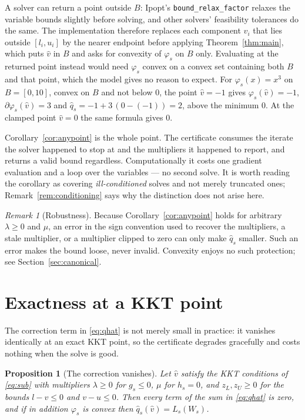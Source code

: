 \documentclass[11pt]{article}
\theoremstyle{plain}
\newtheorem{proposition}[lemma]{Proposition}
\theoremstyle{remark}
\newtheorem{remark}[lemma]{Remark}
\newcommand{\W}{W}
\newcommand{\vhat}{\hat{v}}
\newcommand{\qhat}{\hat{q}}
\begin{document}
A solver can return a point outside $B$: Ipopt's \texttt{bound\_relax\_factor}
relaxes the variable bounds slightly before solving, and other solvers' feasibility
tolerances do the same.  The implementation therefore replaces each component
$\vhat_i$ that lies outside $[l_i, u_i]$ by the nearer endpoint before applying
Theorem~\ref{thm:main}, which puts $\vhat$ in $B$ and asks for convexity of
$\varphi_s$ on $B$ only.  Evaluating at the returned point instead would need
$\varphi_s$ convex on a convex set containing both $B$ and that point, which the
model gives no reason to expect.  For $\varphi_s(x) = x^3$ on $B = [0, 10]$,
convex on $B$ and not below $0$, the point $\vhat = -1$ gives
$\varphi_s(\vhat) = -1$, $\partial \varphi_s(\vhat) = 3$ and
$\qhat_s = -1 + 3\,(0 - (-1)) = 2$, above the minimum $0$.  At the clamped point
$\vhat = 0$ the same formula gives $0$.

Corollary~\ref{cor:anypoint} is the whole point.  The certificate consumes the
iterate the solver happened to stop at and the multipliers it happened to
report, and returns a valid bound regardless.  Computationally it costs one
gradient evaluation and a loop over the variables --- no second solve.  It is
worth reading the corollary as covering \emph{ill-conditioned} solves and not
merely truncated ones; Remark~\ref{rem:conditioning} says why the distinction
does not arise here.

\begin{remark}[Robustness]\label{rem:robust}
Because Corollary~\ref{cor:anypoint} holds for arbitrary $\lambda \ge 0$ and
$\mu$, an error in the sign convention used to recover the multipliers, a stale
multiplier, or a multiplier clipped to zero can only make $\qhat_s$ smaller.
Such an error makes the bound loose, never invalid.  Convexity enjoys no such
protection; see Section~\ref{sec:canonical}.
\end{remark}

\section{Exactness at a KKT point}

The correction term in \eqref{eq:qhat} is not merely small in practice: it
vanishes identically at an exact KKT point, so the certificate degrades
gracefully and costs nothing when the solve is good.

\begin{proposition}[The correction vanishes]\label{prop:kkt}
Let $\vhat$ satisfy the KKT conditions of \eqref{eq:sub} with multipliers
$\lambda \ge 0$ for $g_s \le 0$, $\mu$ for $h_s = 0$, and $z_L, z_U \ge 0$ for
the bounds $l - v \le 0$ and $v - u \le 0$.  Then every term of the sum in
\eqref{eq:qhat} is zero, and if in addition $\varphi_s$ is convex then
$\qhat_s(\vhat) = L_s(\W_s)$.
\end{proposition}
\end{document}
